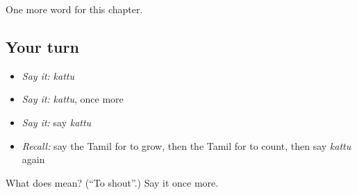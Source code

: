 \begin{grammarlens}[title={What you've built}]
One more word for this chapter.
\end{grammarlens}

\subsection*{Your turn}
\begin{itemize}
\raggedright
  \item \emph{Say it:} \emph{kattu}
  \item \emph{Say it:} \emph{kattu}, once more
  \item \emph{Say it:} say \emph{kattu}
  \item \emph{Recall:} say the Tamil for to grow, then the Tamil for to count, then say \emph{kattu} again
\end{itemize}

\begin{tcolorbox}[breakable,colback=teal!4,colframe=teal!35!black,title={Before you move on}]
What does  mean? (\textquotedblleft{}To shout\textquotedblright{}.) Say it once more.
\end{tcolorbox}
